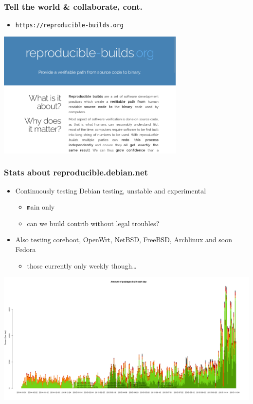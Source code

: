 \documentclass[14pt,aspectratio=169]{beamer}
\begin{document}
\begin{frame}
 \frametitle{Tell the world \& collaborate, cont.}

 \begin{itemize}
  \item \texttt{https://reproducible-builds.org}
 \end{itemize}
 \begin{center}
 \includegraphics[width=0.7\textwidth]{images/rbwww1.png}
 \end{center}
\end{frame}

\begin{frame}
 \frametitle{Stats about reproducible.debian.net}

 \begin{itemize}
  \item Continuously testing Debian testing, unstable and experimental
   \begin{itemize}
    \item \small{ \texttt main only }
    \item \small{ can we build \texttt contrib without legal troubles? }
   \end{itemize}
  \item Also testing coreboot, OpenWrt, NetBSD, FreeBSD,
  Archlinux and soon Fedora
   \begin{itemize}
    \item \small{ those currently only weekly though… }
   \end{itemize}
 \end{itemize}
 \vfill
 \begin{center}
  \includegraphics[height=0.47\paperheight]{images/stats_builds_per_day_amd64.png}
 \end{center}
\end{frame}
\end{document}
